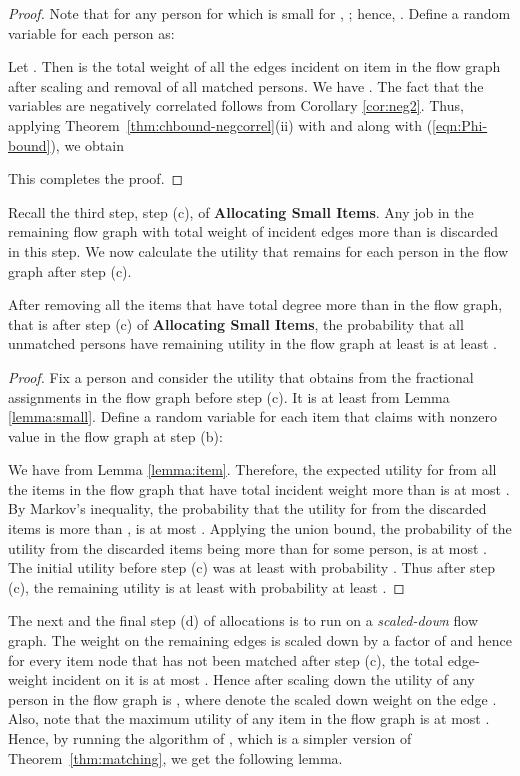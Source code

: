 \begin{proof}
Note that for any person  for which  is small for , ; hence,
. Define a random variable  for each person  as:


Let . Then  is the total weight of all the edges incident on item  in the flow graph
after scaling and removal of all matched persons. We have .
The fact that the variables  are negatively correlated follows from Corollary \ref{cor:neg2}. Thus, applying
Theorem~\ref{thm:chbound-negcorrel}(ii) with  and  along with (\ref{eqn:Phi-bound}), we obtain

This completes the proof.
\end{proof}

Recall the third step, step (c), of {\bf Allocating Small Items}. Any job in the remaining flow graph with total weight of
incident edges more than  is discarded in this step. We now calculate the utility that remains for
each person in the flow graph after step (c).

\begin{lemma}
\label{lemma:stepc}
After removing all the items that have total degree more than  in the flow graph, that is after step (c)
of {\bf Allocating Small Items}, the probability that all unmatched persons have remaining utility in the flow graph at least  is at least .
\end{lemma}
\begin{proof}
Fix a person  and consider the utility that  obtains from the fractional assignments in the flow graph before step (c). It is at least  from Lemma \ref{lemma:small}.
Define a random variable for each item that  claims with nonzero value in the flow graph at step (b):



We have  from Lemma \ref{lemma:item}.
Therefore, the expected utility for  from all the items in the flow graph that have total incident weight
more than    is at most . By Markov's
inequality, the probability that the utility for  from the discarded items is more than , is at most . Applying
the union bound, the probability of the utility from the discarded items being more than  for some person,
is at most . The initial utility before step (c) was at least  with probability .
Thus after step (c), the remaining utility is at least  with probability at least .
\end{proof}

The next and the final step (d) of allocations is to run \cite{dani:05} on a {\em scaled-down} flow graph. 
The weight on the remaining edges is scaled down by a factor of  and hence
for every item node that has not been matched after step (c), the total edge-weight incident on it is at most . Hence after scaling down the utility of any person  in the flow graph is
, where  denote the scaled down weight on the edge . Also, note that the maximum utility of any item in the flow graph is at most . Hence, by running the algorithm of \cite{dani:05}, which is a simpler version of Theorem~\ref{thm:matching}, we get the following lemma.







